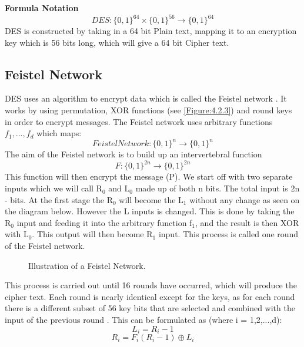\documentclass[11pt,a4paper]{report}
\begin{document}
\textbf{Formula Notation}
\begin{displaymath}
DES: \{0,1\}^{64} \times \{0,1\}^{56} \rightarrow \{0,1\}^{64}
\end{displaymath}
DES is constructed by taking in a 64 bit Plain text, mapping it to an encryption key which is 56 bits long, which will give a 64 bit Cipher text.

\subsection{Feistel Network}
\label{FeistelNet}
DES uses an algorithm to encrypt data which is called the Feistel network \cite{DBLP:books/sp/Buchmann02}. It works by using permutation, XOR functions (see \ref{Figure:4.2.3}) and round keys in order to encrypt messages. The Feistel network uses arbitrary functions $f_{1},...,f_{d}$ which maps:
\begin{displaymath}
FeistelNetwork: \{0,1\}^n \rightarrow \{0,1\}^n
\end{displaymath}
The aim of the Feistel network is to build up an intervertebral function
\begin{displaymath}
F: \{0,1\}^{2n} \rightarrow \{0,1\}^{2n}
\end{displaymath}
This function will then encrypt the message (P). We start off with two separate inputs which we will call R$_{0}$ and L$_{0}$ made up of both n bits. The total input is 2n - bits. At the first stage the R$_{0}$ will become the L$_{1}$ without any change as seen on the diagram below. However the L inputs is changed. This is done by taking the R$_{0}$ input and feeding it into the arbitrary function f$_{1}$, and the result is then XOR with L$_{0}$. This output will then become R$_{1}$ input. This process is called one round of the Feistel network.
\begin{figure}[h]
\centering
\label{Fig: Feistel Network}
\caption{Illustration of a Feistel Network.}
\end{figure}

This process is carried out until 16 rounds have occurred, which will produce the cipher text. Each round is nearly identical except for the keys, as for each round there is a different subset of 56
key bits that are selected and combined with the input of the previous round \cite{Fabio2000LogicalSAT}.
This can be formulated as (where i = 1,2,...,d):
\begin{displaymath}
L_{i} = R_{i}-1
\end{displaymath}
\begin{displaymath}
R_{i} = F_{i} (R_{i}-1) \oplus L_{i}
\end{displaymath}
\end{document}
